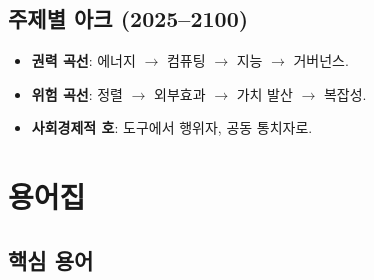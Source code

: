\documentclass[11pt]{article}
\begin{document}
\subsection{주제별 아크 (2025–2100)}
\begin{itemize}[noitemsep]
  \item \textbf{권력 곡선}: 에너지 $\rightarrow$ 컴퓨팅 $\rightarrow$ 지능 $\rightarrow$ 거버넌스.
  \item \textbf{위험 곡선}: 정렬 $\rightarrow$ 외부효과 $\rightarrow$ 가치 발산 $\rightarrow$ 복잡성.
  \item \textbf{사회경제적 호}: 도구에서 행위자, 공동 통치자로.
\end{itemize}

\clearpage

\section*{용어집}

\subsection*{핵심 용어}
\end{document}
